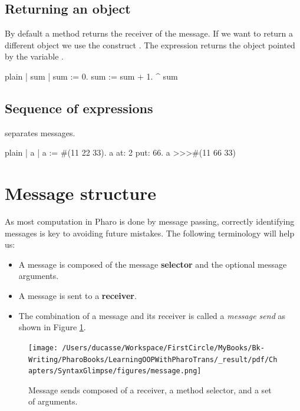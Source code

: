 \documentclass[10pt,twoside,english]{_support/latex/sbabook/sbabook}
\begin{document}
\subsection{Returning an object}
By default a method returns the receiver of the message. If we want to return a different object
we use the construct \textcode{\string^}. The expression  returns the object pointed by the variable .

\begin{displaycode}{plain}
| sum |
sum := 0.
sum := sum + 1.
^ sum 
\end{displaycode}
\subsection{Sequence of expressions}
 separates messages.

\begin{displaycode}{plain}
| a |
a := #(11 22 33).
a at: 2 put: 66.
a
>>>#(11 66 33)
\end{displaycode}
\section{Message structure}
As most computation in Pharo is done by message passing, correctly identifying messages is key to avoiding future mistakes. The following terminology will help us:

\begin{itemize}
\item A message is composed of the message \textbf{selector} and the optional message arguments.
\item A message is sent to a \textbf{receiver}.
\item The combination of a message and its receiver is called a \textit{message send} as shown in Figure \ref{fig:firstScriptMessage}.
\end{itemize}


\begin{figure}

\begin{center}
\texttt{[image: /Users/ducasse/Workspace/FirstCircle/MyBooks/Bk-Writing/PharoBooks/LearningOOPWithPharoTrans/\_result/pdf/Chapters/SyntaxGlimpse/figures/message.png]}\caption{Message sends composed of a receiver, a method selector, and a set of arguments.\label{fig:firstScriptMessage}}\end{center}
\end{figure}
\end{document}
